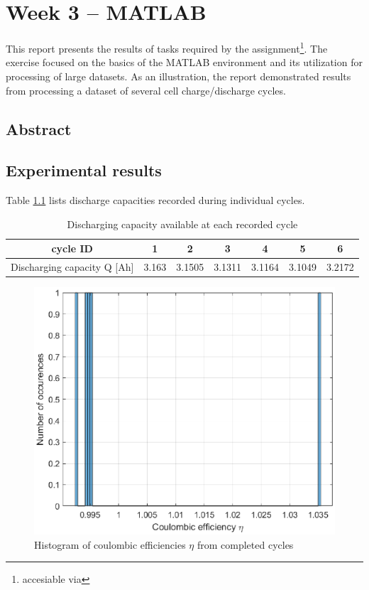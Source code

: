 \chapter{Week 3 -- MATLAB}

This report presents the results of tasks required by the assignment\footnote{accesiable via \vomihwassignment}. The exercise focused on the basics of the MATLAB environment and its utilization for processing of large datasets. As an illustration, the report demonstrated results from processing a dataset of several cell charge/discharge cycles.

\section{Abstract}

\section{Experimental results}

Table \ref{tab:3-dchg-cap} lists discharge capacities recorded during individual cycles.

\begin{table}[htbp]
    \centering
    \begin{tabular}{|c|c|c|c|c|c|c|}
    \hline
         cycle ID & 1 & 2 & 3 & 4 & 5 & 6 \\\hline
         Discharging capacity Q [Ah] &  3.163   &    3.1505       & 3.1311  &     3.1164   &    3.1049      & 3.2172 \\\hline
    \end{tabular}
    \caption{Discharging capacity available at each recorded cycle}
    \label{tab:3-dchg-cap}
\end{table}

\begin{figure}[htbp]
    \centering
    \includegraphics[width=0.75\linewidth]{figures/3/etas.eps}
    \caption{Histogram of coulombic efficiencies $\eta$ from completed cycles}
    \label{fig:3-etas}
\end{figure}

